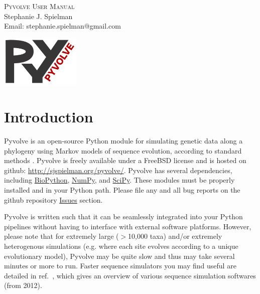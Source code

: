 \documentclass{article}
\begin{document}
\begin{titlepage}
	\begin{center}
	
		
	\textsc{\Huge Pyvolve User Manual}\\[1cm]
		
	{\huge Stephanie J. Spielman}\\[0.5cm]
	
	{\large Email: stephanie.spielman@gmail.com}

	\vspace*{1.5cm}
	\includegraphics[width=1.5in]{pyvolve_logo_manual.png}
	
	
	
	\end{center}
	
	
\end{titlepage}

\newpage

\tableofcontents

\newpage


\section{Introduction}

Pyvolve is an open-source Python module for simulating genetic data along a phylogeny using Markov models of sequence evolution, according to standard methods \cite{Yang2006}. Pyvolve is freely available under a FreeBSD license and is hosted on github:
\href{http://sjspielman.org/pyvolve/}{http://sjspielman.org/pyvolve/}. Pyvolve has several dependencies, including \href{http://biopython.org/wiki/Download}{BioPython}, \href{http://www.scipy.org/install.html}{NumPy}, and \href{http://www.scipy.org/install.html}{SciPy}. These modules must be properly installed and in your Python path. Please file any and all bug reports on the github repository \href{https://github.com/sjspielman/pyvolve/issues}{Issues} section.

Pyvolve is written such that it can be seamlessly integrated into your Python pipelines without having to interface with external software platforms. However, please note that for extremely large ($>$10,000 taxa) and/or extremely heterogenous simulations (e.g. where each site evolves according to a unique evolutionary model), Pyvolve may be quite slow and thus may take several minutes or more to run. Faster sequence simulators you may find useful are detailed in ref.\ \citep{Arenas2012}, which gives an overview of various sequence simulation softwares (from 2012).
\end{document}
